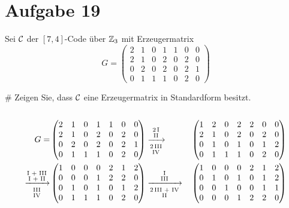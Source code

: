 \section*{Aufgabe 19}
Sei $\mathcal{C}$ der $[7,4]$-Code über $\mathbb{Z}_3$ mit Erzeugermatrix
\begin{equation*}
	G =
	\begin{pmatrix}
	2 & 1 & 0 & 1 & 1 & 0 & 0 \\
	2 & 1 & 0 & 2 & 0 & 2 & 0 \\
	0 & 2 & 0 & 2 & 0 & 2 & 1 \\
	0 & 1 & 1 & 1 & 0 & 2 & 0
	\end{pmatrix}
\end{equation*}
\begin{myList}
#
Zeigen Sie, dass $\mathcal{C}$ eine Erzeugermatrix in Standardform besitzt.\\\\
\begin{align*}
G =&  \begin{pmatrix}
  2 & 1 & 0 & 1 & 1 & 0 & 0 \\
  2 & 1 & 0 & 2 & 0 & 2 & 0 \\
  0 & 2 & 0 & 2 & 0 & 2 & 1 \\
  0 & 1 & 1 & 1 & 0 & 2 & 0
  \end{pmatrix} \lgsto{2\,\rom 1}{\rom 2}{2\,\rom 3}{\rom 4} && \begin{pmatrix}
  1 & 2 & 0 & 2 & 2 & 0 & 0 \\
  2 & 1 & 0 & 2 & 0 & 2 & 0 \\
  0 & 1 & 0 & 1 & 0 & 1 & 2 \\
  0 & 1 & 1 & 1 & 0 & 2 & 0
  \end{pmatrix}\\
\lgsto{\rom 1 + \rom 3}{\rom 1 + \rom 2}{\rom 3}{\rom 4}& \begin{pmatrix}
  1 & 0 & 0 & 0 & 2 & 1 & 2 \\
  0 & 0 & 0 & 1 & 2 & 2 & 0 \\
  0 & 1 & 0 & 1 & 0 & 1 & 2 \\
  0 & 1 & 1 & 1 & 0 & 2 & 0
  \end{pmatrix} \lgsto{\rom 1}{\rom 3}{2\,\rom 3 + \rom 4}{\rom 2} && \begin{pmatrix}
  1 & 0 & 0 & 0 & 2 & 1 & 2 \\
  0 & 1 & 0 & 1 & 0 & 1 & 2 \\
  0 & 0 & 1 & 0 & 0 & 1 & 1 \\
  0 & 0 & 0 & 1 & 2 & 2 & 0 
  \end{pmatrix}\\

\end{align*}
\end{myList}
